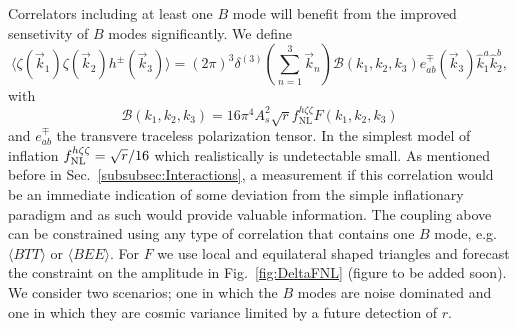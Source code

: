 Correlators including at least one $B$ mode will benefit from the improved sensetivity of $B$ modes significantly. We define \cite{Meerburg2016}
\begin{equation}
\langle \zeta(\vec{k}_1)\zeta(\vec{k}_2)h^{\pm}(\vec{k}_3) \rangle = (2\pi)^3  \delta^{(3)} \left(\sum_{n=1}^3\vec{k}_n\right) \mathcal{B}(k_1,k_2,k_3) e_{ab}^{\mp}(\vec{k}_3)\hat{k}_1^a \hat{k}_2^b, 
\end{equation}
with 
\begin{equation}
\mathcal{B}(k_1,k_2,k_3)= 16 \pi^4 A_s^2 \sqrt{r}f_\mathrm{NL}^{h\zeta\zeta} F(k_1,k_2,k_3)
\end{equation}
and $e_{ab}^{\mp}$ the transvere traceless polarization tensor. 
In the simplest model of inflation $f^{h \zeta \zeta}_{\rm NL} = \sqrt{r}/16$ \cite{Maldacena:2002vr,Maldacena:2011nz} which realistically is undetectable small. As mentioned before in Sec.~\ref{subsubsec:Interactions}, a measurement if this correlation would be an immediate indication of some deviation from the simple inflationary paradigm and as such would provide valuable information. The coupling above can be constrained using any type of correlation that contains one $B$ mode, e.g. $\langle BTT \rangle$ or $\langle BEE\rangle$. For $F$ we use local and equilateral shaped triangles and forecast the constraint on the amplitude in Fig.~\ref{fig:DeltaFNL} (figure to be added soon). We consider two scenarios; one in which the $B$ modes are noise dominated and one in which they are cosmic variance limited by a future detection of $r$. 

